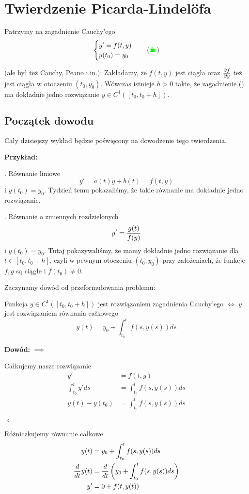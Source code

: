 \section{Twierdzenie Picarda-Lindel\"ofa}
Patrzymy na zagadnienie Cauchy'ego
$$\begin{cases}
    y'=f(t, y)\\
    y(t_0)=y_0
\end{cases}\quad (\coffee)$$

 (ale był też Cauchy, Peano i.in.): Zakładamy, że $f(t, y)$ jest ciągła oraz ${\partial f\over\partial y}$ też jest ciągła w otoczeniu $(t_0, y_0)$. Wówczas istnieje $h>0$ takie, że zagadnienie (\coffee) ma dokładnie jedno rozwiązanie $y\in C^1([t_0,t_0+h])$.

\subsection{Początek dowodu}

Cały dzisiejszy wykład będzie poświęcony na dowodzenie tego twierdzenia.

\textbf{Przykład:}

. Równanie liniowe 
$$y'=a(t)y+b(t)=f(t, y)$$ 
i $y(t_0)=y_0$. Tydzień temu pokazaliśmy, że takie równanie ma dokładnie jedno rozwiązanie.

. Równanie o zmiennych rozdzielonych
$$y'={g(t)\over f(y)}$$
i $y(t_0)=y_0$. Tutaj pokazywaliśmy, że mamy dokładnie jedno rozwiązanie dla $t\in [t_0,t_0+h]$, czyli w pewnym otoczeniu $(t_0, y_0)$ przy założeniach, że funkcje $f,g$ są ciągłe i $f(t_0)\neq 0$.
\medskip

Zaczynamy dowód od przeformułowania problemu:

\textbf{\large{}} Funkcja $y\in C^1([t_0, t_0+h])$ jest rozwiązaniem zagadnienia Cauchy'ego $\iff$ $y$ jest rozwiązaniem równania całkowego
$$y(t)=y_0+\int_{t_0}^tf(s, y(s))ds$$

\textbf{Dowód:}
$\implies$

Całkujemy nasze rozwiązanie
\begin{align*}
    y'&=f(t, y)\\
    \int_{t_0}^ty'ds&=\int_{t_0}^tf(s, y(s))ds\\
    y(t)-y(t_0)&=\int_{t_0}^tf(s, y(s))ds
\end{align*}

$\impliedby$

Różniczkujemy równanie całkowe
\begin{align*}
    y(t)&=y_0+\int_{t_0}^tf(s, y(s))ds\\
    {d\over dt}y(t)&={d\over dt}\left(y_0+\int_{t_0}^tf(s, y(s))ds\right)\\
    y'&=0+f(t, y(t))
\end{align*}
\proofend

